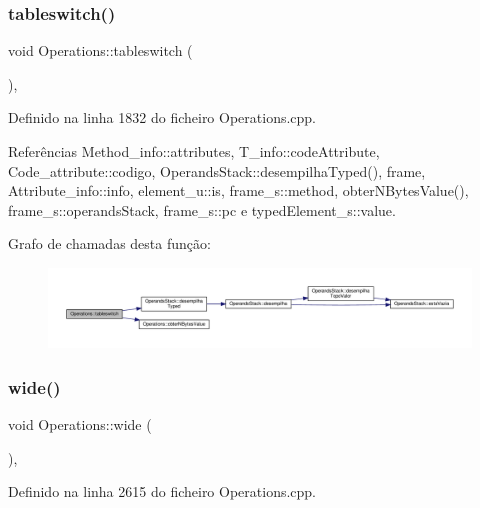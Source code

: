 \subsubsection{\texorpdfstring{tableswitch()}{tableswitch()}}
{\footnotesize\ttfamily void Operations\+::tableswitch (\begin{DoxyParamCaption}{ }\end{DoxyParamCaption})\hspace{0.3cm}{\ttfamily [static]}, {\ttfamily [private]}}



Definido na linha 1832 do ficheiro Operations.\+cpp.



Referências Method\+\_\+info\+::attributes, T\+\_\+info\+::code\+Attribute, Code\+\_\+attribute\+::codigo, Operands\+Stack\+::desempilha\+Typed(), frame, Attribute\+\_\+info\+::info, element\+\_\+u\+::is, frame\+\_\+s\+::method, obter\+N\+Bytes\+Value(), frame\+\_\+s\+::operands\+Stack, frame\+\_\+s\+::pc e typed\+Element\+\_\+s\+::value.

Grafo de chamadas desta função\+:\nopagebreak
\begin{figure}[H]
\begin{center}
\leavevmode
\includegraphics[width=350pt]{classOperations_a72955f43cde98b73c503e1a8c1505352_cgraph}
\end{center}
\end{figure}
\mbox{\label{classOperations_ab1474dfc4eb5142361b00d185f0a4a2b}} 
\subsubsection{\texorpdfstring{wide()}{wide()}}
{\footnotesize\ttfamily void Operations\+::wide (\begin{DoxyParamCaption}{ }\end{DoxyParamCaption})\hspace{0.3cm}{\ttfamily [static]}, {\ttfamily [private]}}



Definido na linha 2615 do ficheiro Operations.\+cpp.



